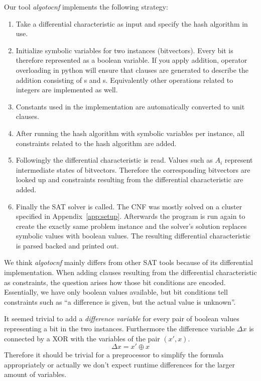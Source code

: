 Our tool \emph{algotocnf} implements the following strategy:
\begin{enumerate}
  \item Take a differential characteristic as input and specify the hash algorithm in use.
  \item Initialize symbolic variables for two instances (bitvectors).
    Every bit is therefore represented as a boolean variable.
    If you apply addition, operator overloading in python will ensure
    that clauses are generated to describe the addition consisting of s and s.
    Equivalently other operations related to integers are implemented as well.
  \item Constants used in the implementation are automatically converted to unit clauses.
  \item After running the hash algorithm with symbolic variables per instance,
    all constraints related to the hash algorithm are added.
  \item Followingly the differential characteristic is read. Values such as $A_i$
    represent intermediate states of bitvectors. Therefore the corresponding bitvectors
    are looked up and constraints resulting from the differential characteristic are
    added.
  \item Finally the SAT solver is called. The CNF was mostly solved on a cluster
    specified in Appendix~\ref{app:setup}. Afterwards the program is run again to
    create the exactly same problem instance and the solver's solution replaces
    symbolic values with boolean values. The resulting differential characteristic
    is parsed backed and printed out.
\end{enumerate}

We think \emph{algotocnf} mainly differs from other SAT tools because of its
differential implementation. When adding clauses resulting from the differential
characteristic as constraints, the question arises how those bit conditions are
encoded. Essentially, we have only boolean values available, but bit conditions
tell constraints such as \enquote{a difference is given, but the actual value
is unknown}.

It seemed trivial to add a \emph{difference variable} for every pair of boolean
values representing a bit in the two instances. Furthermore the difference
variable $\Delta x$ is connected by a XOR with the variables of the pair $(x', x)$.
\[ \Delta x = x' \oplus x \]
Therefore it should be trivial for a preprocessor to simplify the formula
appropriately or actually we don't expect runtime differences for the larger
amount of variables.

